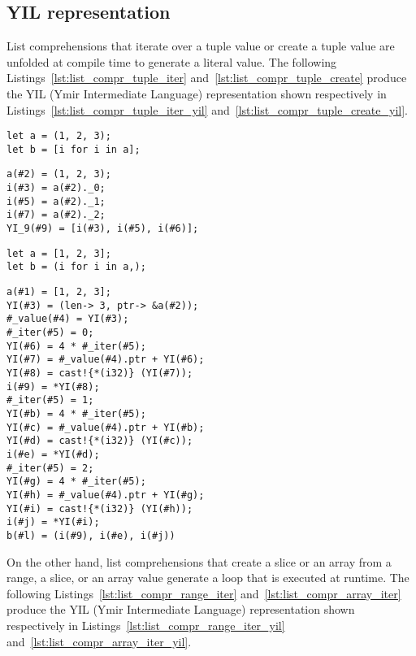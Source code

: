 \subsection {YIL representation}

List comprehensions that iterate over a tuple value or create a tuple value are
unfolded at compile time to generate a literal value. The following
Listings~\ref{lst:list_compr_tuple_iter} and~\ref{lst:list_compr_tuple_create}
produce the YIL (Ymir Intermediate Language) representation shown respectively
in Listings~\ref{lst:list_compr_tuple_iter_yil}
and~\ref{lst:list_compr_tuple_create_yil}.

\begin{lstlisting}[style=coloredverbatim, label=lst:list_compr_tuple_iter, caption=List comprehension iterating over a tuple]
let a = (1, 2, 3);
let b = [i for i in a];
\end{lstlisting}

\begin{lstlisting}[style=lyilVerb, label=lst:list_compr_tuple_iter_yil, caption=YIL representation of Listing~\ref{lst:list_compr_tuple_iter}]
a(#2) = (1, 2, 3);
i(#3) = a(#2)._0;
i(#5) = a(#2)._1;
i(#7) = a(#2)._2;
YI_9(#9) = [i(#3), i(#5), i(#6)];
\end{lstlisting}

\begin{lstlisting}[style=coloredverbatim, label=lst:list_compr_tuple_create, caption=List comprehension iterating over a tuple]
let a = [1, 2, 3];
let b = (i for i in a,);
\end{lstlisting}

\begin{lstlisting}[style=lyilVerb, label=lst:list_compr_tuple_create_yil, caption=YIL representation of Listing~\ref{lst:list_compr_tuple_iter}]
a(#1) = [1, 2, 3];
YI(#3) = (len-> 3, ptr-> &a(#2));
#_value(#4) = YI(#3);
#_iter(#5) = 0;
YI(#6) = 4 * #_iter(#5);
YI(#7) = #_value(#4).ptr + YI(#6);
YI(#8) = cast!{*(i32)} (YI(#7));
i(#9) = *YI(#8);
#_iter(#5) = 1;
YI(#b) = 4 * #_iter(#5);
YI(#c) = #_value(#4).ptr + YI(#b);
YI(#d) = cast!{*(i32)} (YI(#c));
i(#e) = *YI(#d);
#_iter(#5) = 2;
YI(#g) = 4 * #_iter(#5);
YI(#h) = #_value(#4).ptr + YI(#g);
YI(#i) = cast!{*(i32)} (YI(#h));
i(#j) = *YI(#i);
b(#l) = (i(#9), i(#e), i(#j))
\end{lstlisting}

On the other hand, list comprehensions that create a slice or an array from a
range, a slice, or an array value generate a loop that is executed at runtime.
The following Listings~\ref{lst:list_compr_range_iter}
and~\ref{lst:list_compr_array_iter} produce the YIL (Ymir Intermediate Language)
representation shown respectively in
Listings~\ref{lst:list_compr_range_iter_yil}
and~\ref{lst:list_compr_array_iter_yil}.

